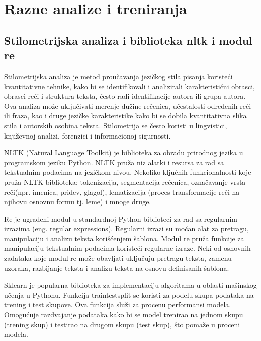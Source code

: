 \documentclass{article}
\begin{document}
\section{Razne analize i treniranja}
\subsection{Stilometrijska analiza i biblioteka nltk i modul re}


\begin{flushleft}

Stilometrijska analiza je metod proučavanja jezičkog stila pisanja koristeći 
kvantitativne tehnike, kako bi se identifikovali i analizirali karakteristični 
obrasci, obrasci reči i struktura teksta, često radi identifikacije autora ili 
grupa autora. Ova analiza može uključivati merenje dužine rečenica, učestalosti 
određenih reči ili fraza, kao i druge jezičke karakteristike kako bi se dobila 
kvantitativna slika stila i autorskih osobina teksta. Stilometrija se često koristi
u lingvistici, književnoj analizi, forenzici i informacionoj sigurnosti. \\

\vspace{2mm}


NLTK (Natural Language Toolkit) je biblioteka za obradu prirodnog jezika u 
programskom jeziku Python. NLTK pruža niz alatki i resursa za rad sa tekstualnim
podacima na jezičkom nivou. Nekoliko ključnih funkcionalnosti koje pruža NLTK biblioteka:
tokenizacija, segmentacija rečenica, označavanje vrsta reči(npr. imenica, pridev, 
glagol), lematizacija (proces transformacije reči na njihovu osnovnu formu tj. leme) i
mnoge druge.\\

\vspace{2mm}

Re je ugrađeni modul u standardnoj Python biblioteci za rad sa regularnim 
izrazima (eng. regular expressions). Regularni izrazi su moćan alat za pretragu, 
manipulaciju i analizu teksta korišćenjem šablona. Modul re pruža funkcije za 
manipulaciju tekstualnim podacima koristeći regularne izraze. Neki od osnovnih 
zadataka koje modul re može obavljati uključuju pretragu teksta, zamenu uzoraka, 
razbijanje teksta i analizu teksta na osnovu definisanih šablona.
\vspace{2mm}

Sklearn je popularna biblioteka za implementaciju algoritama u oblasti mašinskog učenja u Pythonu. Funkcija train\textunderscore test\textunderscore split se koristi za podelu skupa podataka na trening i test skupove. Ova funkcija služi za procenu performansi modela. Omogućuje razdvajanje podataka kako bi se model trenirao na jednom skupu (trening
skup) i testirao na drugom skupu (test skup), što pomaže u proceni modela.\\ \vspace{2mm}


\end{flushleft}
\end{document}
